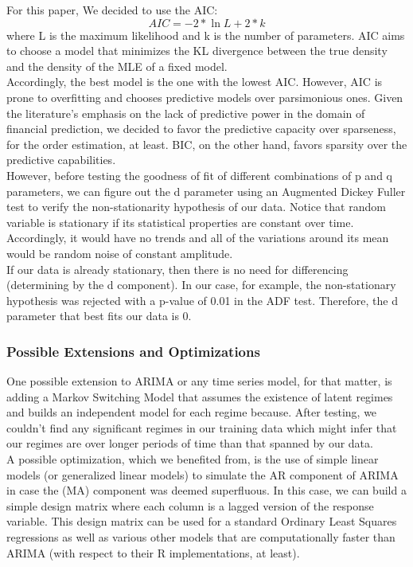 For this paper, We decided to use the AIC: $$AIC = -2*\ln{L} + 2*k$$ where L is the maximum likelihood and k is the number of parameters. AIC aims to choose a model that minimizes the KL divergence between the true density and the density of the MLE of a fixed model.\\
Accordingly, the best model is the one with the lowest AIC. However, AIC is prone to overfitting and chooses predictive models over parsimonious ones. Given the literature's emphasis on the lack of predictive power in the domain of financial prediction, we decided to favor the predictive capacity over sparseness, for the order estimation, at least. BIC, on the other hand, favors sparsity over the predictive capabilities. \\
However, before testing the goodness of fit of different combinations of p and q parameters, we can figure out the d parameter using an Augmented Dickey Fuller test to verify the non-stationarity hypothesis of our data. Notice that random variable is stationary if its statistical properties are constant over time. Accordingly, it would have no trends and all of the variations around its mean would be random noise of constant amplitude. \cite{tsay, VAR}\\
If our data is already stationary, then there is no need for differencing (determining by the d component). In our case, for example, the non-stationary hypothesis was rejected with a p-value of 0.01 in the ADF test. Therefore, the d parameter that best fits our data is 0. \\
\subsubsection{Possible Extensions and Optimizations}
One possible extension to ARIMA or any time series model, for that matter, is adding a Markov Switching Model that assumes the existence of latent regimes and builds an independent model for each regime because.\cite{MS} After testing, we couldn't find any significant regimes in our training data which might infer that our regimes are over longer periods of time than that spanned by our data.\\
A possible optimization, which we benefited from, is the use of simple linear models (or generalized linear models) to simulate the AR component of ARIMA in case the (MA) component was deemed superfluous. In this case, we can build a simple design matrix where each column is a lagged version of the response variable. This design matrix can be used for a standard Ordinary Least Squares regressions as well as various other models that are computationally faster than ARIMA (with respect to their R implementations, at least).\\
